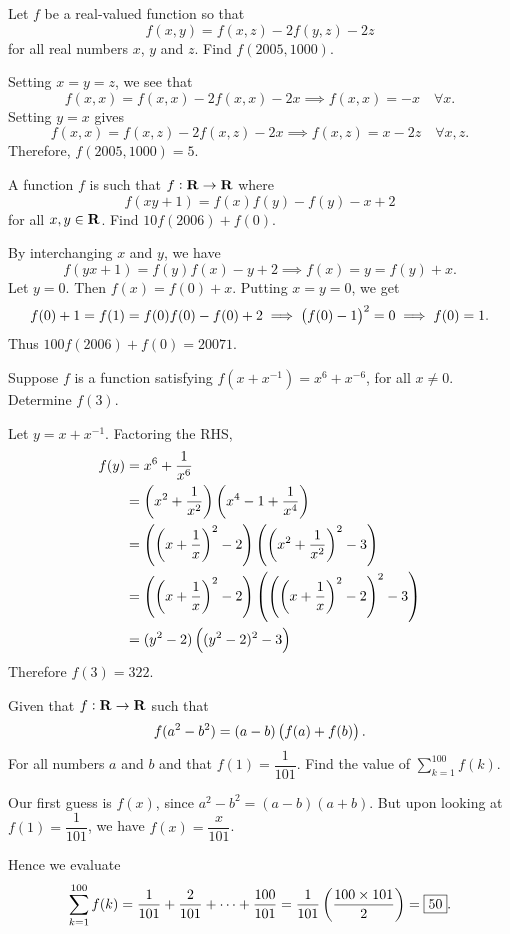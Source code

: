 \begin{prbm}
Let $f$ be a real-valued function so that
\[ f(x,y)=f(x,z)-2f(y,z)-2z \]
for all real numbers $x$, $y$ and $z$. Find $f(2005,1000)$.
\end{prbm}

\begin{solution}
Setting $x=y=z$, we see that
\[ f(x,x)=f(x,x)-2f(x,x)-2x \implies f(x,x)=-x\quad\forall x. \]
Setting $y=x$ gives
\[ f(x,x)=f(x,z)-2f(x,z)-2x \implies f(x,z)=x-2z\quad\forall x,z. \]
Therefore, $f(2005,1000)=5$.
\end{solution}

\begin{prbm}
A function $f$ is such that $f:\mathbf R\to\mathbf R$ where
\[ f(xy+1)=f(x)f(y)-f(y)-x+2 \]
for all $x,y\in\mathbf R$. Find $10f(2006)+f(0)$.
\end{prbm}

\begin{solution}
By interchanging $x$ and $y$, we have
\[ f(yx+1)=f(y)f(x)-y+2 \implies f(x)=y=f(y)+x. \]
Let $y=0$. Then $f(x)=f(0)+x$. Putting $x=y=0$, we get
\[ f(0)+1=f(1)=f(0)f(0)-f(0)+2 \implies \left(f(0)-1\right)^2=0 \implies f(0)=1. \]
Thus $100f(2006)+f(0)=20071$.
\end{solution}

\begin{prbm}
Suppose $f$ is a function satisfying $f(x+x^{-1})=x^6+x^{-6}$, for all $x\neq0$. Determine $f(3)$.
\end{prbm}

\begin{solution}
Let $y=x+x^{-1}$. Factoring the RHS,
\begin{align*}
f(y) &= x^6+\frac{1}{x^6} \\
&= \left(x^2+\frac{1}{x^2}\right)\left(x^4-1+\frac{1}{x^4}\right) \\
&= \left(\left(x+\frac{1}{x}\right)^2-2\right)\left(\left(x^2+\frac{1}{x^2}\right)^2-3\right) \\
&= \left(\left(x+\frac{1}{x}\right)^2-2\right)\left(\left(\left(x+\frac{1}{x}\right)^2-2\right)^2-3\right) \\
&= (y^2-2)\left((y^2-2)^2-3\right)
\end{align*}
Therefore $f(3)=322$.
\end{solution}

\begin{prbm}
Given that $f:\mathbf R\to\mathbf R$ such that
\[ f(a^2-b^2)=(a-b)\left(f(a)+f(b)\right). \]
For all numbers $a$ and $b$ and that $f(1)=\dfrac{1}{101}$. Find the value of $\sum_{k=1}^{100}f(k)$.
\end{prbm}
\begin{solution}
Our first guess is $f(x)$, since $a^2-b^2=(a-b)(a+b)$. But upon looking at $f(1)=\dfrac{1}{101}$, we have $f(x)=\dfrac{x}{101}$.

Hence we evaluate
\[ \sum_{k=1}^{100}f(k)=\frac{1}{101}+\frac{2}{101}+\cdots+\frac{100}{101}=\frac{1}{101}\left(\frac{100\times101}{2}\right)=\boxed{50}. \]
\end{solution}

